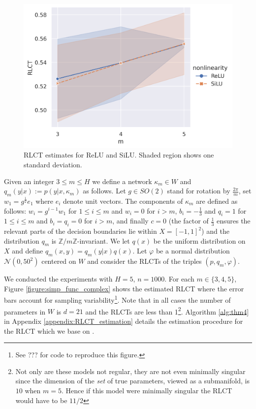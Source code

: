 \documentclass{article} %
\begin{document}
\begin{figure}[h]
\begin{center}
\includegraphics[scale=0.6]{RLCTplot.png}
\end{center}
\caption{RLCT estimates for ReLU and SiLU. Shaded region shows one standard deviation.}
\label{figure:simp_func_complex2}
\end{figure}

Given an integer $3 \le m \le H$ we define a network $\kappa_m \in W$ and $q_m(y|x) := p(y|x, \kappa_m)$ as follows. Let $g \in SO(2)$ stand for rotation by $\frac{2\pi}{m}$, set $w_1 = g^{\tfrac{1}{2}} e_1$ where $e_i$ denote unit vectors. The components of $\kappa_m$ are defined as follows: $w_i = g^{i-1} w_1$ for $1 \le i \le m$ and $w_i = 0$ for $i > m$, $b_i = - \tfrac{1}{3}$ and $q_i = 1$ for $1 \le i \le m$ and $b_i = q_i = 0$ for $i > m$, and finally $c = 0$ (the factor of $\tfrac{1}{3}$ ensures the relevant parts of the decision boundaries lie within $X = [-1,1]^2$) and the distribution $q_m$ is $\mathbb{Z}/m\mathbb{Z}$-invariant. We let $q(x)$ be the uniform distribution on $X$ and define $q_m(x,y) = q_m(y|x) q(x)$. Let $\varphi$ be a normal distribution $\mathcal{N}(0,50^2)$ centered on $W$ and consider the RLCTs of the triples $(p, q_m, \varphi)$. 

We conducted the experiments with $H = 5$, $n = 1000$. For each $m \in \{3,4,5\}$, Figure \ref{figure:simp_func_complex} shows the estimated RLCT where the error bars account for sampling variability\footnote{See ??? for code to reproduce this figure.}. Note that in all cases the number of parameters in $W$ is $d = 21$ and the RLCTs are less than 1\footnote{Not only are these models not regular, they are not even minimally singular since the dimension of the \emph{set} of true parameters, viewed as a submanifold, is $10$ when $m = 5$. Hence if this model were minimally singular the RLCT would have to be $11/2$}. Algorithm \ref{alg:thm4} in Appendix \ref{appendix:RLCT_estimation} details the estimation procedure for the RLCT which we base on \citep[Theorem 4]{watanabe_widely_2013}. 
\end{document}
